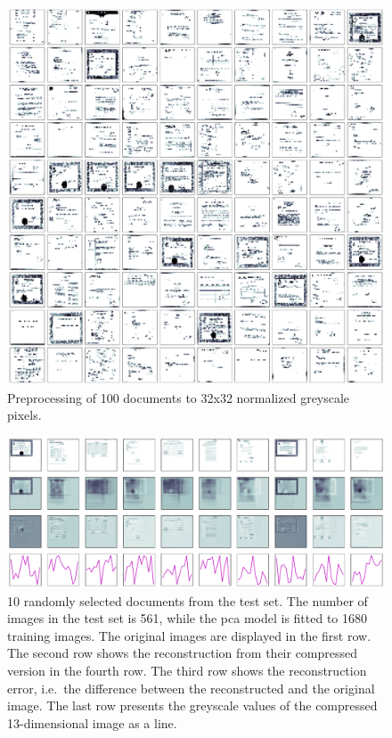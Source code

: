 \begin{figure}[!htb] %
    \centering
    \includegraphics[width=1\textwidth]{images/OPTICS/32x32/preprocessed_docs.pdf}
    \caption[Preprocessing to 32x32 normalized greyscale pixels]{Preprocessing of 100 documents to 32x32 normalized greyscale pixels.
    }
    \label{fig:preprocessed_docs_32x32}
\end{figure}


\begin{figure}[!htb] %
    \centering
    \includegraphics[width=1\textwidth]{images/Eigendocs/transformation/eigendocs.pdf}
    \caption[Preprocessing 10 randomly selected documents from the test set]{10 randomly selected documents from the test set.
    The number of images in the test set is 561, while the \ac{pca} model is fitted to 1680 training images.
    The original images are displayed in the first row.
    The second row shows the reconstruction from their compressed version in the fourth row.
    The third row shows the reconstruction error, i.e.\ the difference between the reconstructed and the original image.
    The last row presents the greyscale values of the compressed 13-dimensional image as a line.
    }
    \label{fig:preprocessed_docs_eigendocs}
\end{figure}

